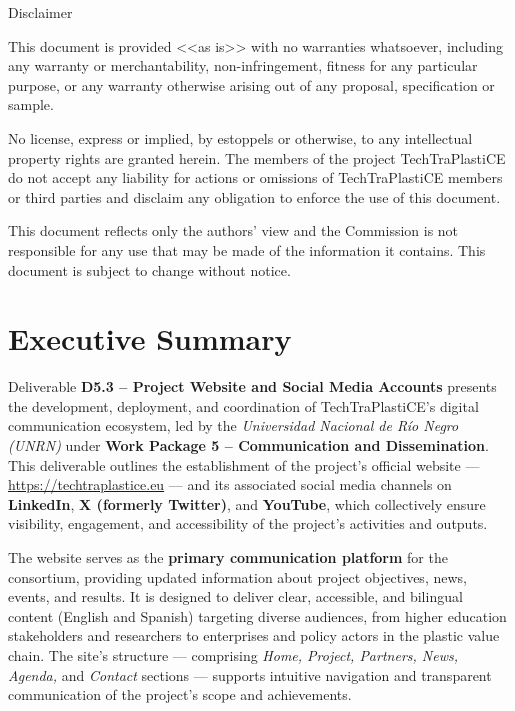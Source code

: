 \documentclass[
  12pt,
  oneside]{book}
\renewcommand*\contentsname{Table of contents}
\newcommand\contentsname{Table of contents}
\begin{document}
\begin{frontmatter}
\begin{titlepage}
{    Disclaimer
    
    This document is provided <<as is>> with no warranties whatsoever, 
    including any warranty or merchantability, non-infringement, fitness for any particular 
    purpose, or any warranty otherwise arising out of any proposal, specification or sample.  
    
    No license, express or implied, by estoppels or otherwise, to any intellectual 
    property rights are granted herein. 
    The members of the project TechTraPlastiCE do not accept any liability for actions or 
    omissions of TechTraPlastiCE members or third parties and disclaim any obligation 
    to enforce the use of this document. 
    
    This document reflects only the authors' view and the Commission is not responsible 
    for any use that may be made of the information it contains.  
    This document is subject to change without notice. 
    
    }
    \normalsize
    
    
    
      \end{titlepage}
  \end{frontmatter}

\renewcommand*\contentsname{Contents}
{
\setcounter{tocdepth}{2}
\tableofcontents
}
\listoffigures

\mainmatter
\chapter{Executive Summary}\label{executive-summary}

Deliverable \textbf{D5.3 -- Project Website and Social Media Accounts}
presents the development, deployment, and coordination of
TechTraPlastiCE's digital communication ecosystem, led by the
\emph{Universidad Nacional de Río Negro (UNRN)} under \textbf{Work
Package 5 -- Communication and Dissemination}.\\
This deliverable outlines the establishment of the project's official
website --- \url{https://techtraplastice.eu} --- and its associated
social media channels on \textbf{LinkedIn}, \textbf{X (formerly
Twitter)}, and \textbf{YouTube}, which collectively ensure visibility,
engagement, and accessibility of the project's activities and outputs.

The website serves as the \textbf{primary communication platform} for
the consortium, providing updated information about project objectives,
news, events, and results. It is designed to deliver clear, accessible,
and bilingual content (English and Spanish) targeting diverse audiences,
from higher education stakeholders and researchers to enterprises and
policy actors in the plastic value chain. The site's structure ---
comprising \emph{Home, Project, Partners, News, Agenda,} and
\emph{Contact} sections --- supports intuitive navigation and
transparent communication of the project's scope and achievements.
\end{document}

